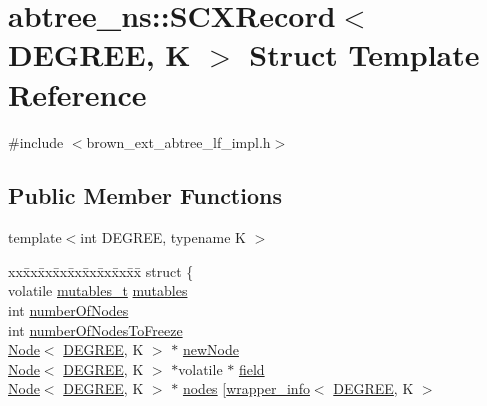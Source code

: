 \hypertarget{structabtree__ns_1_1SCXRecord}{}\section{abtree\+\_\+ns\+:\+:S\+C\+X\+Record$<$ D\+E\+G\+R\+EE, K $>$ Struct Template Reference}
\label{structabtree__ns_1_1SCXRecord}


{\ttfamily \#include $<$brown\+\_\+ext\+\_\+abtree\+\_\+lf\+\_\+impl.\+h$>$}

\subsection*{Public Member Functions}
\begin{DoxyCompactItemize}
\item 
template$<$int D\+E\+G\+R\+EE, typename K $>$ \begin{tabbing}
xx\=xx\=xx\=xx\=xx\=xx\=xx\=xx\=xx\=\kill
struct \{\\
\>volatile \hyperlink{descriptors_8h_a8a5af2749482b19d7515054489efca22}{mutables\_t} \hyperlink{structabtree__ns_1_1SCXRecord_a828700a9e594bc10b8275561705a49f2}{mutables}\\
\>int \hyperlink{structabtree__ns_1_1SCXRecord_a69bfa2456660401bf10a86c10778092c}{numberOfNodes}\\
\>int \hyperlink{structabtree__ns_1_1SCXRecord_ae83141edf6e69d3691efa21ffde9776a}{numberOfNodesToFreeze}\\
\>\hyperlink{structabtree__ns_1_1Node}{Node}$<$ \hyperlink{brown__sigouin__abtree__kcas_2adapter_8h_a5d88b17d70c985f2f2b8e987037fd6dd}{DEGREE}, K $>$ $\ast$ \hyperlink{structabtree__ns_1_1SCXRecord_af82257ea120b285bd7b737c8927c9d90}{newNode}\\
\>\hyperlink{structabtree__ns_1_1Node}{Node}$<$ \hyperlink{brown__sigouin__abtree__kcas_2adapter_8h_a5d88b17d70c985f2f2b8e987037fd6dd}{DEGREE}, K $>$ $\ast$volatile $\ast$ \hyperlink{structabtree__ns_1_1SCXRecord_ab75f0b7eb40e69140e9e570a9b258692}{field}\\
\>\hyperlink{structabtree__ns_1_1Node}{Node}$<$ \hyperlink{brown__sigouin__abtree__kcas_2adapter_8h_a5d88b17d70c985f2f2b8e987037fd6dd}{DEGREE}, K $>$ $\ast$ \hyperlink{structabtree__ns_1_1SCXRecord_a8748b6aeafb8c5d9e4b1854cfb3184e3}{nodes} \mbox{[}\hyperlink{classabtree__ns_1_1wrapper__info}{wrapper\_info}$<$ \hyperlink{brown__sigouin__abtree__kcas_2adapter_8h_a5d88b17d70c985f2f2b8e987037fd6dd}{DEGREE}, K $>$\\

\end{tabbing}
\end{DoxyCompactItemize}
